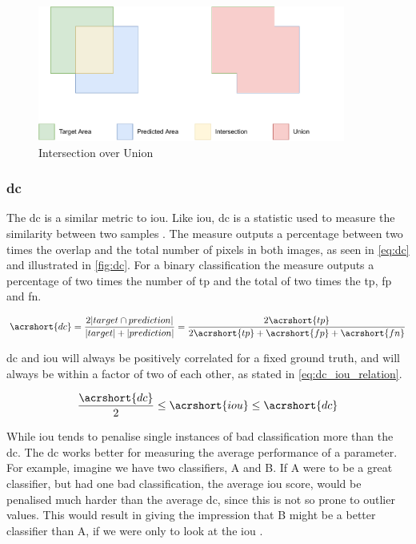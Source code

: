 \begin{figure}[H]
  \centering
  \includegraphics[width=0.9\textwidth]{img/objective_measures/iou.pdf}
  \caption{Intersection over Union}
  \label{fig:iou}
\end{figure}

\subsubsection{\acrlong{dc}}
The \acrfull{dc} is a similar metric to \acrlong{iou}. Like \acrlong{iou}, \acrlong{dc} is a statistic used to measure the similarity between two samples \cite{sorensen}\cite{dice}. The measure outputs a percentage between two times the overlap and the total number of pixels in both images, as seen in \autoref{eq:dc} and illustrated in \autoref{fig:dc}. For a binary classification the measure outputs a percentage of two times the number of \acrlong{tp} and the total of two times the \acrlong{tp}, \acrlong{fp} and \acrlong{fn}.

\begin{equation}\label{eq:dc}
    \acrshort{dc} =  \frac{2|target \cap prediction|}{|target| + |prediction|} = \frac{2\acrshort{tp}}{2\acrshort{tp}+ \acrshort{fp} + \acrshort{fn}}
\end{equation}

\acrlong{dc} and \acrlong{iou} will always be positively correlated for a fixed ground truth, and will always be within a factor of two of each other, as stated in \autoref{eq:dc_iou_relation}.

\begin{equation}\label{eq:dc_iou_relation}
    \frac{\acrshort{dc}}{2} \leq \acrshort{iou} \leq \acrshort{dc}
\end{equation}

While \acrlong{iou} tends to penalise single instances of bad classification more than the \acrlong{dc}. The \acrlong{dc} works better for measuring the average performance of a parameter. For example, imagine we have two classifiers, A and B. If A were to be a great classifier, but had one bad classification, the average \acrlong{iou} score, would be penalised much harder than the average \acrlong{dc}, since this is not so prone to outlier values. This would result in giving the impression that B might be a better classifier than A, if we were only to look at the \acrlong{iou} \cite{276144}.

